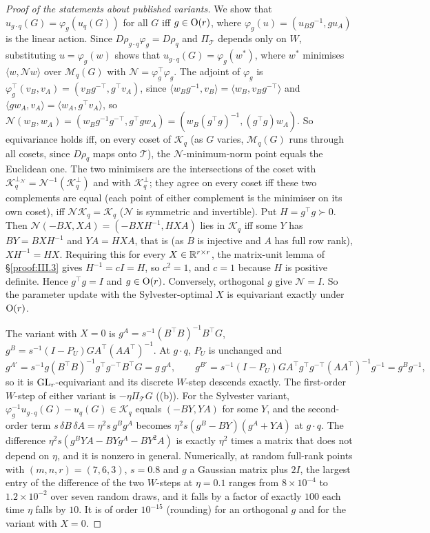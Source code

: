 \begin{proof}[Proof of the statements about published variants]
We show that $u_{g\cdot q}(G)=\varphi_g(u_q(G))$ for all $G$ iff $g\in\mathrm{O}(r)$, where $\varphi_g(u)=(u_Bg^{-1},gu_A)$ is
the linear action. Since $D\rho_{g\cdot q}\varphi_g=D\rho_q$ and $\Pi_{\mathcal T}$ depends only on $W$, substituting
$u=\varphi_g(w)$ shows that $u_{g\cdot q}(G)=\varphi_g(w^*)$, where $w^*$ minimises $\langle w,\mathcal Nw\rangle$ over
$\mathcal M_q(G)$ with $\mathcal N=\varphi_g^\top\varphi_g$. The adjoint of $\varphi_g$ is $\varphi_g^\top(v_B,v_A)=(v_Bg^{-\top},g^\top v_A)$,
since $\langle w_Bg^{-1},v_B\rangle=\langle w_B,v_Bg^{-\top}\rangle$ and $\langle gw_A,v_A\rangle=\langle w_A,g^\top v_A\rangle$, so
$\mathcal N(w_B,w_A)=(w_Bg^{-1}g^{-\top},g^\top gw_A)=(w_B(g^\top g)^{-1},(g^\top g)w_A)$. So
equivariance holds iff, on every coset of $\mathcal K_q$ (as $G$ varies, $\mathcal M_q(G)$ runs through all cosets, since
$D\rho_q$ maps onto $\mathcal T$), the $\mathcal N$-minimum-norm point equals the Euclidean one. The two minimisers are the
intersections of the coset with $\mathcal K_q^{\perp_{\mathcal N}}=\mathcal N^{-1}(\mathcal K_q^\perp)$ and with
$\mathcal K_q^\perp$; they agree on every coset iff these two complements are equal (each point of either complement is the minimiser on its
own coset), iff $\mathcal N\mathcal K_q=\mathcal K_q$
($\mathcal N$ is symmetric and invertible). Put $H=g^\top g\succ0$. Then $\mathcal N(-BX,XA)=(-BXH^{-1},HXA)$ lies in
$\mathcal K_q$ iff some $Y$ has $BY=BXH^{-1}$ and $YA=HXA$, that is (as $B$ is injective and $A$ has full row rank),
$XH^{-1}=HX$. Requiring this for every $X\in\mathbb{R}^{r\times r}$, the matrix-unit lemma of \S\ref{proof:III.3} gives
$H^{-1}=cI=H$, so $c^2=1$, and $c=1$ because $H$ is positive definite. Hence $g^\top g=I$ and $g\in\mathrm{O}(r)$.
Conversely, orthogonal $g$ give $\mathcal N=I$. So the parameter update with the Sylvester-optimal $X$ is equivariant
exactly under $\mathrm{O}(r)$.

The variant with $X=0$ is $g^A=s^{-1}(B^\top B)^{-1}B^\top G$, $g^B=s^{-1}(I-P_U)GA^\top(AA^\top)^{-1}$. At $g\cdot q$,
$P_U$ is unchanged and
\[g^{A'}=s^{-1}g(B^\top B)^{-1}g^\top g^{-\top}B^\top G=g\,g^A,\qquad g^{B'}=s^{-1}(I-P_U)GA^\top g^\top g^{-\top}(AA^\top)^{-1}g^{-1}=g^Bg^{-1},\]
so it is $\mathrm{GL}_r$-equivariant and its discrete $W$-step descends exactly. The first-order $W$-step of either variant is
$-\eta\Pi_{\mathcal T}G$ ((b)). For the Sylvester variant, $\varphi_g^{-1}u_{g\cdot q}(G)-u_q(G)\in\mathcal K_q$
equals $(-BY,YA)$ for some $Y$, and the second-order term $s\,\delta B\,\delta A=\eta^2s\,g^Bg^A$ becomes
$\eta^2s(g^B-BY)(g^A+YA)$ at $g\cdot q$. The difference $\eta^2s(g^BYA-BYg^A-BY^2A)$ is exactly $\eta^2$ times a matrix that does not depend on $\eta$, and it
is nonzero in general. Numerically, at random
full-rank points with $(m,n,r)=(7,6,3)$, $s=0.8$ and $g$ a Gaussian matrix plus $2I$, the largest entry of the
difference of the two $W$-steps at $\eta=0.1$ ranges from $8\times10^{-4}$ to $1.2\times10^{-2}$ over seven random draws,
and it falls by a factor of exactly $100$ each time $\eta$ falls by $10$. It is of
order $10^{-15}$ (rounding) for an orthogonal $g$ and for the variant with $X=0$.


\end{proof}
